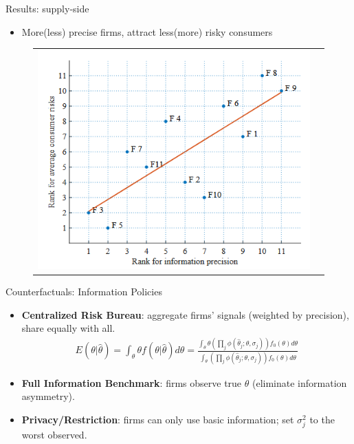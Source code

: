 \documentclass[10pt,aspectratio=169]{beamer}
\begin{document}
\begin{frame}{Results: supply-side}
\begin{itemize}
  \item More(less) precise firms, attract less(more) risky consumers
\end{itemize}
\begin{figure}[H]
\centering{}%
\begin{tabular}{cc}
\includegraphics[scale=0.57]{Figures/Fig4.png}
\end{tabular}
\end{figure}
\end{frame}

\begin{frame}{Counterfactuals: Information Policies}
\justifying
\begin{itemize}
  \item \textbf{Centralized Risk Bureau}: aggregate firms’ signals (weighted by precision), share equally with all.
  \begin{align}
  E(\theta|\hat{\theta}) = \int_{\theta} \theta f(\theta|\hat{\theta}) d\theta = \frac{\int_{\theta} \theta \left( \prod_j \phi(\hat{\theta}_j; \theta, \sigma_j) \right) f_0(\theta) d\theta}{\int_{\theta} \left( \prod_j \phi(\hat{\theta}_j; \theta, \sigma_j) \right) f_0(\theta) d\theta}
\end{align}
  \item \textbf{Full Information Benchmark}: firms observe true $\theta$ (eliminate information asymmetry).
  \item \textbf{Privacy/Restriction}: firms can only use basic information; set $\sigma_j^2$ to the worst observed.
\end{itemize}
\end{frame}
\end{document}
